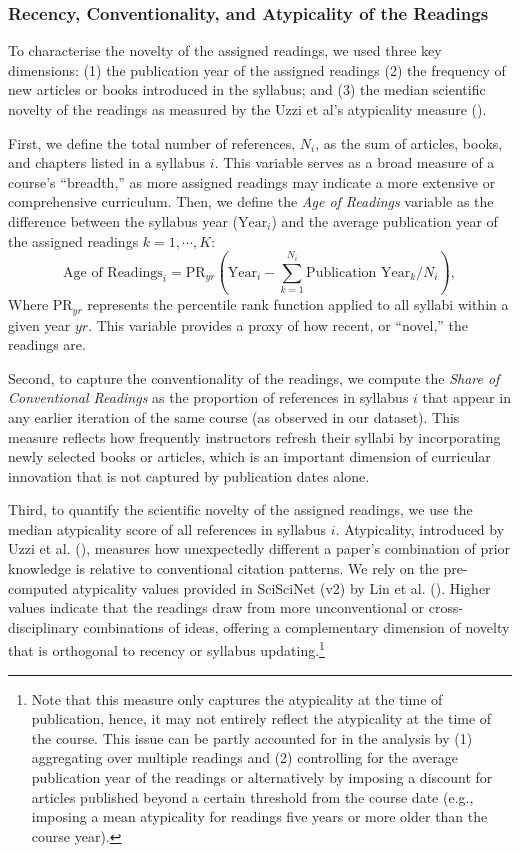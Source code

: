 \documentclass[
  british,
  12pt, %
]{article}
\begin{document}
\subsubsection{Recency, Conventionality, and Atypicality of the Readings}\label{recency-conventionality-and-atypicality-of-the-readings}

To characterise the novelty of the assigned readings, we used three key dimensions: (1) the publication year of the assigned readings (2) the frequency of new articles or books introduced in the syllabus; and (3) the median scientific novelty of the readings as measured by the Uzzi et al's atypicality measure ().

First, we define the total number of references, \(N_i\), as the sum of articles, books, and chapters listed in a syllabus \(i\). This variable serves as a broad measure of a course's ``breadth,'' as more assigned readings may indicate a more extensive or comprehensive curriculum. Then, we define the \emph{Age of Readings} variable as the difference between the syllabus year (\(\text{Year}_i\)) and the average publication year of the assigned readings \(k=1,\cdots,K\):\\
\[
  \text{Age of Readings}_i =
  \text{PR}_{yr}\left(\text{Year}_i - \sum_{k=1}^{N_i} \text{Publication Year}_k / N_i\right),
\]
Where \(\text{PR}_{yr}\) represents the percentile rank function applied to all syllabi within a given year \(yr\). This variable provides a proxy of how recent, or ``novel,'' the readings are.

Second, to capture the conventionality of the readings, we compute the \emph{Share of Conventional Readings} as the proportion of references in syllabus \(i\) that appear in any earlier iteration of the same course (as observed in our dataset). This measure reflects how frequently instructors refresh their syllabi by incorporating newly selected books or articles, which is an important dimension of curricular innovation that is not captured by publication dates alone.

Third, to quantify the scientific novelty of the assigned readings, we use the median atypicality score of all references in syllabus \(i\). Atypicality, introduced by Uzzi et al. (), measures how unexpectedly different a paper's combination of prior knowledge is relative to conventional citation patterns. We rely on the pre-computed atypicality values provided in SciSciNet (v2) by Lin et al. (). Higher values indicate that the readings draw from more unconventional or cross-disciplinary combinations of ideas, offering a complementary dimension of novelty that is orthogonal to recency or syllabus updating.\footnote{
  Note that this measure only captures the atypicality at the time of publication, hence, it may not entirely reflect the atypicality at the time of the course. This issue can be partly accounted for in the analysis by (1) aggregating over multiple readings and (2) controlling for the average publication year of the readings or alternatively by imposing a discount for articles published beyond a certain threshold from the course date (e.g., imposing a mean atypicality for readings five years or more older than the course year).}
\end{document}
